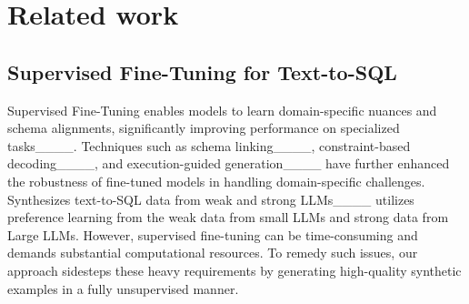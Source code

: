 \section{Related work}


\subsection{Supervised Fine-Tuning for Text-to-SQL}
Supervised Fine-Tuning enables models to learn domain-specific nuances and schema alignments, significantly improving performance on specialized tasks____. Techniques such as schema linking____, constraint-based decoding____, and execution-guided generation____ have further enhanced the robustness of fine-tuned models in handling domain-specific challenges. Synthesizes text-to-SQL data from weak and strong LLMs____ utilizes preference learning from the weak data from small LLMs and strong data from Large LLMs. %
However, supervised fine-tuning can be time-consuming and demands substantial computational resources. To remedy such issues, our approach sidesteps these heavy requirements by generating high-quality synthetic examples in a fully unsupervised manner.

